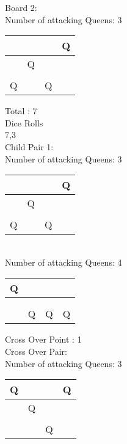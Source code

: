 \documentclass[a4paper,10pt]{article}
\begin{document}
\begin{flushleft}
\begin{flushleft}
\begin{flushleft}
\begin{flushleft}
\begin{flushleft}
\begin{flushleft}
\begin{flushleft}
\begin{flushleft}
\begin{flushleft}
\begin{flushleft}
\begin{flushleft}
\begin{flushleft}
\begin{flushleft}
\begin{flushleft}
\begin{flushleft}
\begin{flushleft}
\begin{flushleft}
\begin{tabular}{| l | l | l | l |}
    \end{tabular}
\break
\begin{flushleft}
Board 2:\\
Number of attacking Queens: 3\\
\vspace{5mm}
    \begin{tabular}{| l | l | l | l |}
    \hline
     & & & Q\\ \hline
     & Q & & \\ \hline
     & & & \\ \hline
     Q & & Q & \\ \hline
    \end{tabular}
\break
Total : 7\\
Dice Rolls\\
7,3\\
Child Pair 1:\\
Number of attacking Queens: 3\\
\vspace{5mm}
    \begin{tabular}{| l | l | l | l |}
    \hline
     & & & Q\\ \hline
     & Q & & \\ \hline
     & & & \\ \hline
     Q & & Q & \\ \hline
    \end{tabular}
\break
\\
Number of attacking Queens: 4\\
\vspace{5mm}
    \begin{tabular}{| l | l | l | l |}
    \hline
     Q & & & \\ \hline
     & & & \\ \hline
     & & & \\ \hline
     & Q & Q & Q \\ \hline
    \end{tabular}
\break
Cross Over Point : 1\\
Cross Over Pair: \\
Number of attacking Queens: 3\\
\vspace{5mm}
    \begin{tabular}{| l | l | l | l |}
    \hline
     Q & & & Q \\ \hline
     & Q& & \\ \hline
     & & & \\ \hline
     & & Q & \\ \hline

\end{tabular}
\end{flushleft}
\end{flushleft}
\end{flushleft}
\end{flushleft}
\end{flushleft}
\end{flushleft}
\end{flushleft}
\end{flushleft}
\end{flushleft}
\end{flushleft}
\end{flushleft}
\end{flushleft}
\end{flushleft}
\end{flushleft}
\end{flushleft}
\end{flushleft}
\end{flushleft}
\end{flushleft}
\end{document}

